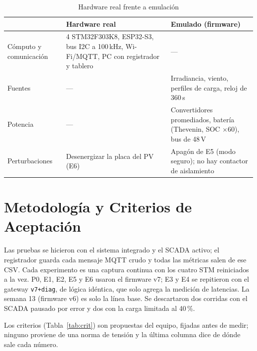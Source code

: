 \documentclass[conference]{IEEEtran}
\begin{document}
\begin{table}[!t]
\caption{Hardware real frente a emulación}
\label{tab:hw}
\centering
\scriptsize\setlength{\tabcolsep}{3pt}
\begin{tabular}{|p{1.45cm}|p{2.7cm}|p{2.6cm}|}
\hline
 & \textbf{Hardware real} & \textbf{Emulado (firmware)} \\
\hline
Cómputo y comunicación & 4 STM32F303K8, ESP32-S3, bus I2C a 100\,kHz, Wi-Fi/MQTT, PC con registrador y tablero & --- \\ \hline
Fuentes & --- & Irradiancia, viento, perfiles de carga, reloj de 360\,s \\ \hline
Potencia & --- & Convertidores promediados, batería (Thevenin, SOC $\times60$), bus de 48\,V \\ \hline
Perturbaciones & Desenergizar la placa del PV (E6) & Apagón de E5 (modo seguro); no hay contactor de aislamiento \\ \hline
\end{tabular}
\end{table}

\section{Metodología y Criterios de Aceptación}
\label{sec:metodo}

Las pruebas se hicieron con el sistema integrado y el SCADA activo; el registrador guarda cada mensaje MQTT crudo y todas las métricas salen de ese CSV. Cada experimento es una captura continua con los cuatro STM reiniciados a la vez. P0, E1, E2, E5 y E6 usaron el firmware v7; E3 y E4 se repitieron con el gateway \texttt{v7+diag}, de lógica idéntica, que solo agrega la medición de latencias. La semana 13 (firmware v6) es solo la línea base. Se descartaron dos corridas con el SCADA pausado por error y dos con la carga limitada al 40\,\%.

Los criterios (Tabla~\ref{tab:crit}) son propuestas del equipo, fijadas antes de medir; ninguno proviene de una norma de tensión y la última columna dice de dónde sale cada número.
\end{document}

